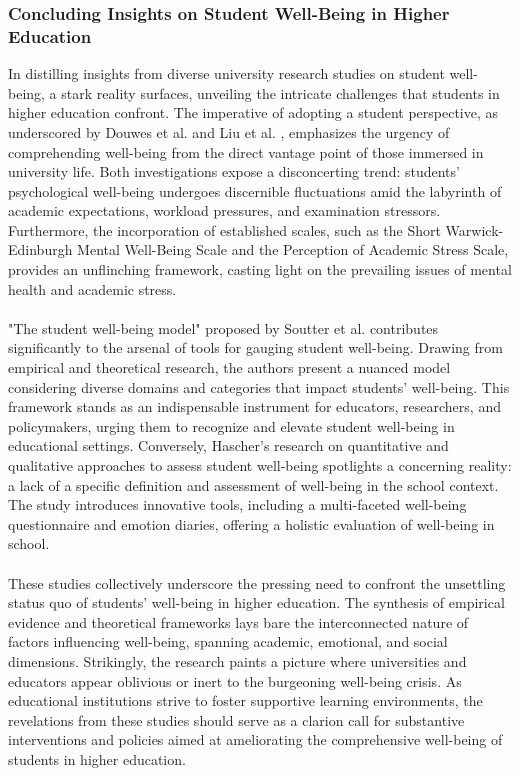\documentclass[11pt]{report}
\begin{document}
\subsubsection{Concluding Insights on Student Well-Being in Higher Education}

In distilling insights from diverse university research studies on student well-being, a stark reality surfaces, unveiling the intricate challenges that students in higher education confront. The imperative of adopting a student perspective, as underscored by Douwes et al. \cite{research-1} and Liu et al. \cite{research-2}, emphasizes the urgency of comprehending well-being from the direct vantage point of those immersed in university life. Both investigations expose a disconcerting trend: students' psychological well-being undergoes discernible fluctuations amid the labyrinth of academic expectations, workload pressures, and examination stressors. Furthermore, the incorporation of established scales, such as the Short Warwick-Edinburgh Mental Well-Being Scale and the Perception of Academic Stress Scale, provides an unflinching framework, casting light on the prevailing issues of mental health and academic stress.\\ \\
"The student well-being model" proposed by Soutter et al. \cite{research-3} contributes significantly to the arsenal of tools for gauging student well-being. Drawing from empirical and theoretical research, the authors present a nuanced model considering diverse domains and categories that impact students' well-being. This framework stands as an indispensable instrument for educators, researchers, and policymakers, urging them to recognize and elevate student well-being in educational settings. Conversely, Hascher's \cite{research-4} research on quantitative and qualitative approaches to assess student well-being spotlights a concerning reality: a lack of a specific definition and assessment of well-being in the school context. The study introduces innovative tools, including a multi-faceted well-being questionnaire and emotion diaries, offering a holistic evaluation of well-being in school.\\ \\
These studies collectively underscore the pressing need to confront the unsettling status quo of students' well-being in higher education. The synthesis of empirical evidence and theoretical frameworks lays bare the interconnected nature of factors influencing well-being, spanning academic, emotional, and social dimensions. Strikingly, the research paints a picture where universities and educators appear oblivious or inert to the burgeoning well-being crisis. As educational institutions strive to foster supportive learning environments, the revelations from these studies should serve as a clarion call for substantive interventions and policies aimed at ameliorating the comprehensive well-being of students in higher education.
\end{document}
